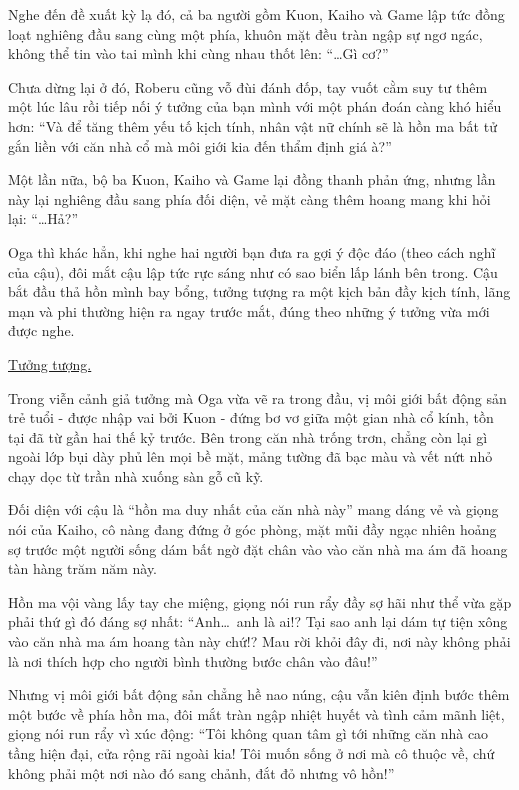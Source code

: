 \documentclass[../main.tex]{subfiles}
\begin{document}
Nghe đến đề xuất kỳ lạ đó, cả ba người gồm Kuon, Kaiho và Game lập tức đồng loạt nghiêng đầu sang cùng một phía, khuôn mặt đều tràn ngập sự ngơ ngác, không thể tin vào tai mình khi cùng nhau thốt lên: ``\dots Gì cơ?''

Chưa dừng lại ở đó, Roberu cũng vỗ đùi đánh đốp, tay vuốt cằm suy tư thêm một lúc lâu rồi tiếp nối ý tưởng của bạn mình với một phán đoán càng khó hiểu hơn: ``Và để tăng thêm yếu tố kịch tính, nhân vật nữ chính sẽ là hồn ma bất tử gắn liền với căn nhà cổ mà môi giới kia đến thẩm định giá à?''

Một lần nữa, bộ ba Kuon, Kaiho và Game lại đồng thanh phản ứng, nhưng lần này lại nghiêng đầu sang phía đối diện, vẻ mặt càng thêm hoang mang khi hỏi lại: ``\dots Hả?''

Oga thì khác hẳn, khi nghe hai người bạn đưa ra gợi ý độc đáo (theo cách nghĩ của cậu), đôi mắt cậu lập tức rực sáng như có sao biển lấp lánh bên trong. Cậu bắt đầu thả hồn mình bay bổng, tưởng tượng ra một kịch bản đầy kịch tính, lãng mạn và phi thường hiện ra ngay trước mắt, đúng theo những ý tưởng vừa mới được nghe.

\begin{center}
  \uline{Tưởng tượng.}
\end{center}

Trong viễn cảnh giả tưởng mà Oga vừa vẽ ra trong đầu, vị môi giới bất động sản trẻ tuổi - được nhập vai bởi Kuon - đứng bơ vơ giữa một gian nhà cổ kính, tồn tại đã từ gần hai thế kỷ trước. Bên trong căn nhà trống trơn, chẳng còn lại gì ngoài lớp bụi dày phủ lên mọi bề mặt, mảng tường đã bạc màu và vết nứt nhỏ chạy dọc từ trần nhà xuống sàn gỗ cũ kỹ.

Đối diện với cậu là ``hồn ma duy nhất của căn nhà này'' mang dáng vẻ và giọng nói của Kaiho, cô nàng đang đứng ở góc phòng, mặt mũi đầy ngạc nhiên hoảng sợ trước một người sống dám bất ngờ đặt chân vào vào căn nhà ma ám đã hoang tàn hàng trăm năm này.

Hồn ma vội vàng lấy tay che miệng, giọng nói run rẩy đầy sợ hãi như thể vừa gặp phải thứ gì đó đáng sợ nhất: ``Anh\dots\ anh là ai!? Tại sao anh lại dám tự tiện xông vào căn nhà ma ám hoang tàn này chứ!? Mau rời khỏi đây đi, nơi này không phải là nơi thích hợp cho người bình thường bước chân vào đâu!''

Nhưng vị môi giới bất động sản chẳng hề nao núng, cậu vẫn kiên định bước thêm một bước về phía hồn ma, đôi mắt tràn ngập nhiệt huyết và tình cảm mãnh liệt, giọng nói run rẩy vì xúc động: ``Tôi không quan tâm gì tới những căn nhà cao tầng hiện đại, cửa rộng rãi ngoài kia! Tôi muốn sống ở nơi mà cô thuộc về, chứ không phải một nơi nào đó sang chảnh, đắt đỏ nhưng vô hồn!''
\end{document}
